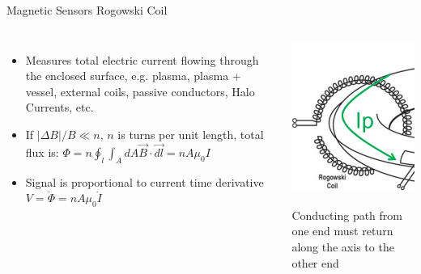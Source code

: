 \documentclass{beamer}
\begin{document}
\begin{frame}{Magnetic Sensors } {Rogowski Coil}

\begin{columns}
  \begin{itemize}
  \item Measures \alert{ total electric current} flowing through the enclosed surface, e.g. plasma, plasma + vessel, external coils, passive conductors, Halo Currents, etc.
  \item   If $|\Delta B|/B \ll n $, $n$ is turns per unit length,  total flux  is:
$\Phi = n \oint_l \int_A d A \vec{B}\cdot \vec{d l} = n A \mu_0 I$
\item Signal is proportional to current time derivative $ V= \dot{\Phi} =  n A \mu_0 \dot{I}$	
\end{itemize}
	\begin{center}
	\includegraphics[width=.8\columnwidth]{rogow.png}
	 \begin{block}{} 
		\small Conducting path from one end must return along the axis to the other end
	\end{block} 
	\end{center}

\end{columns}	
\end{frame}
\end{document}

